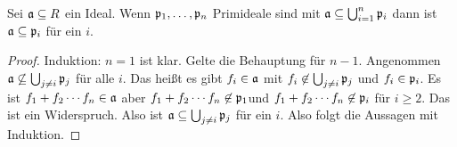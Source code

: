 \begin{Lemma}[Primvermeidung]
    Sei \(\mathfrak{a}\subseteq R\) ein Ideal. Wenn \(\mathfrak{p}_1,\dots,\mathfrak{p}_n\) Primideale sind mit \(\mathfrak{a}\subseteq \bigcup_{i=1}^n\mathfrak{p}_i\) dann ist \(\mathfrak{a}\subseteq \mathfrak{p}_i\) für ein \(i\).
    
\end{Lemma}
\begin{proof}
    Induktion: \(n=1\) ist klar. Gelte die Behauptung für \(n-1\). Angenommen \(\mathfrak{a}\not\subseteq \bigcup_{j\neq i}\mathfrak{p}_j\) für alle \(i\). Das heißt es gibt \(f_i\in\mathfrak{a}\) mit \(f_i\not\in\bigcup_{j\neq i}\mathfrak{p}_j\) und \(f_i\in\mathfrak{p}_i\).
    Es ist \(f_1+f_2\cdots f_n\in\mathfrak{a}\) aber \(f_1+f_2\cdots f_n\not\in \mathfrak{p}_1\)und \(f_1+f_2\cdots f_n\not\in\mathfrak{p}_i\) für \(i\geq 2\). Das ist ein Widerspruch. Also ist \(\mathfrak{a}\subseteq \bigcup_{j\neq i}\mathfrak{p}_j\) für ein \(i\). Also folgt die Aussagen mit Induktion.
\end{proof}

